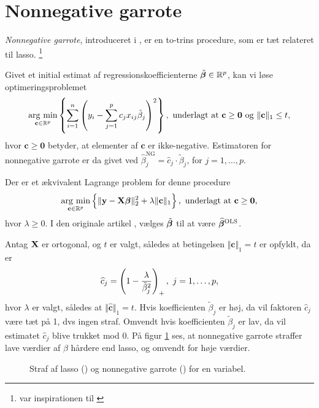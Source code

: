 \section{Nonnegative garrote} \label{sec:nonnegativegarrote}
\textit{Nonnegative garrote}, introduceret i \citep{nonnegative_garrote}, er en to-trins procedure, som er tæt relateret til lasso. \footnote{\citep{nonnegative_garrote} var inspirationen til \citep{lasso}} 
\begin{defn}
Givet et initial estimat af regressionskoefficienterne \(\tilde{\boldsymbol{\beta}} \in \mathbb{R}^p\), kan vi løse optimeringsproblemet
\begin{align}
\argmin_{\mathbf{c} \in \mathbb{R}^p}  \cbr{ \sum_{i=1}^n \del{y_i - \sum_{j=1}^p c_j x_{ij} \tilde{\beta}_j}^2}, \ \text{underlagt at } \mathbf{c} \geq \mathbf{0} \text{ og } \Vert \mathbf{c} \Vert_1 \leq t, \label{eq:2.19}
\end{align}
hvor \(\mathbf{c} \geq \mathbf{0}\) betyder, at elementer af \(\mathbf{c}\) er ikke-negative.
Estimatoren for nonnegative garrote er da givet ved \(\widehat{\beta}_j^\text{NG} = \widehat{c}_j \cdot \tilde{\beta}_j\), for \(j = 1, \ldots, p\).
\end{defn}
Der er et ækvivalent Lagrange problem for denne procedure
\begin{align}
\argmin_{\mathbf{c} \in \mathbb{R}^p}  \cbr{\Vert \y - \X \tbeta \Vert_2^2 + \lambda \Vert \mathbf{c} \Vert_1}, \ \text{underlagt at } \mathbf{c} \geq \mathbf{0}, \label{eq:nonnegative_garrote}
\end{align}
hvor \(\lambda \geq 0\).
I den originale artikel \citep{nonnegative_garrote}, vælges \(\tilde{\boldsymbol{\beta}}\) til at være \(\widehat{\boldsymbol{\beta}}^\text{OLS}\).
 
Antag \(\mathbf{X}\) er ortogonal, og \(t\) er valgt, således at betingelsen \(\Vert \mathbf{c} \Vert_1 = t\) er opfyldt, da er
\begin{align*}
\widehat{c}_j = \del{1 - \frac{\lambda}{\tilde{\beta}_j^2}}_+, \ j = 1, \ldots, p,
\end{align*}
hvor \(\lambda\) er valgt, således at \(\Vert \widehat{\mathbf{c}} \Vert_1 = t\).
Hvis koefficienten \(\tilde{\beta}_j\) er høj, da vil faktoren \(\widehat{c}_j\) være tæt på 1, dvs ingen straf.
Omvendt hvis koefficienten \(\tilde{\beta}_j\) er lav, da vil estimatet \(\widehat{c}_j\) blive trukket mod 0.
På figur \ref{fig:nonnegative_garrote} ses, at nonnegative garrote straffer lave værdier af \(\beta\) hårdere end lasso, og omvendt for høje værdier.
%
\begin{figure}[H]
\centering
\scalebox{0.8}{}
\caption[optional short text]{Straf af lasso () og nonnegative garrote () for en variabel. 
} \label{fig:nonnegative_garrote}
\end{figure}
%

